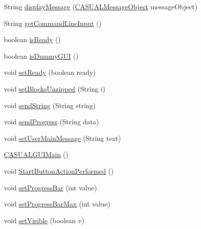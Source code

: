 \begin{DoxyCompactItemize}
\item 
String \hyperlink{class_g_u_i_1_1development_1_1_c_a_s_u_a_l_g_u_i_main_a9a613331ac8043d579fff7c31e29c17d}{display\-Message} (\hyperlink{class_c_a_s_u_a_l_1_1_c_a_s_u_a_l_message_object}{C\-A\-S\-U\-A\-L\-Message\-Object} message\-Object)
\item 
String \hyperlink{class_g_u_i_1_1development_1_1_c_a_s_u_a_l_g_u_i_main_af435dc7d2ccc8cca299f03e5d04c79b8}{get\-Command\-Line\-Input} ()
\item 
boolean \hyperlink{class_g_u_i_1_1development_1_1_c_a_s_u_a_l_g_u_i_main_a1309b5c1bd0cebf65515d0c089627c4e}{is\-Ready} ()
\item 
boolean \hyperlink{class_g_u_i_1_1development_1_1_c_a_s_u_a_l_g_u_i_main_a81d97bc67cb2ff55eaa07d1e871704dd}{is\-Dummy\-G\-U\-I} ()
\item 
void \hyperlink{class_g_u_i_1_1development_1_1_c_a_s_u_a_l_g_u_i_main_a62b7a1d1bd8ea87c4a7e25f640473885}{set\-Ready} (boolean ready)
\item 
void \hyperlink{class_g_u_i_1_1development_1_1_c_a_s_u_a_l_g_u_i_main_a7c7021e46586c92c30c7b65b0d69bb1f}{set\-Blocks\-Unzipped} (String i)
\item 
void \hyperlink{class_g_u_i_1_1development_1_1_c_a_s_u_a_l_g_u_i_main_a2c1916fe71c5f2b99f55ce201eb56793}{send\-String} (String string)
\item 
void \hyperlink{class_g_u_i_1_1development_1_1_c_a_s_u_a_l_g_u_i_main_ab7f5af9a20dc226fe30272669c4006b6}{send\-Progress} (String data)
\item 
void \hyperlink{class_g_u_i_1_1development_1_1_c_a_s_u_a_l_g_u_i_main_a2a62b2c8d83a4fbc3e037566a75b069f}{set\-User\-Main\-Message} (String text)
\item 
\hyperlink{class_g_u_i_1_1development_1_1_c_a_s_u_a_l_g_u_i_main_a7b75fd1a4dfe40b9b1bb76c34fa78525}{C\-A\-S\-U\-A\-L\-G\-U\-I\-Main} ()
\item 
void \hyperlink{class_g_u_i_1_1development_1_1_c_a_s_u_a_l_g_u_i_main_a1591bd6e9773eb113aa3cd5ea3a8651c}{Start\-Button\-Action\-Performed} ()
\item 
void \hyperlink{class_g_u_i_1_1development_1_1_c_a_s_u_a_l_g_u_i_main_a485021bf885eda530b3291470592b77c}{set\-Progress\-Bar} (int value)
\item 
void \hyperlink{class_g_u_i_1_1development_1_1_c_a_s_u_a_l_g_u_i_main_af248eecd00123cc7a6d5632cd345ba8a}{set\-Progress\-Bar\-Max} (int value)
\item 
void \hyperlink{class_g_u_i_1_1development_1_1_c_a_s_u_a_l_g_u_i_main_aece5df6056dcef63f5d26f47f20a7bdc}{set\-Visible} (boolean v)

\end{DoxyCompactItemize}
